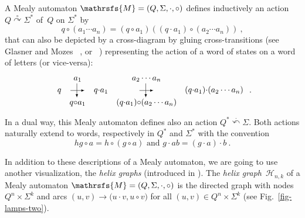 \documentclass{amsart}
\begin{document}
A Mealy automaton ${{{\mathrsfs{{M}}}}}=({{{Q}}},{{{\Sigma}}},{{{\cdot}}},{{{\circ}}})$ defines inductively an action ${{{Q}}}\overset{{{\circ}}}{\curvearrowright} {{{\Sigma}}}^{*}$ of~${{{Q}}}$ on ${{{\Sigma}}}^{*}$ by
$$
q{{{\circ}}} (a_{1}\cdots a_{n})=(q{{{\circ}}} a_{1})\left((q{{{\cdot}}} a_{1}){{{\circ}}} (a_{2}\cdots a_{n})\right)\:,
$$
that can also be depicted by a cross-diagram  by gluing cross-transitions  (see Glasner and Mozes ~\cite{GlaMoz05}, or ~\cite{aklmp12}) representing the action of a word of states on a word of letters (or vice-versa): 
\[\begin{array}{ccccc}
		& a_1            	&            		& a_2 \cdots a_n       			& \\
q		& {\tikz[baseline=-.5ex]{\draw[->,>=latex] (0,0) -- (4ex,0); \draw[->,>=latex] (1.8ex,2ex) -- (1.8ex,-2ex);}}    	& q {{{\cdot}}} a_1 	& {\tikz[baseline=-.5ex]{\draw[->,>=latex] (0,0) -- (4ex,0); \draw[->,>=latex] (1.8ex,2ex) -- (1.8ex,-2ex);}}				&(q {{{\cdot}}} a_1) {{{\cdot}}} (a_2 \cdots a_n)  \\
		& q {{{\circ}}} a_1 	&            		&(q {{{\cdot}}} a_1) {{{\circ}}} (a_2 \cdots a_n)  
\end{array} \: .\]

In a dual way, this Mealy automaton defines also an action  ${{{Q}}}^{*}\overset{{{\cdot}}}{\curvearrowleft} {{{\Sigma}}}$. Both actions naturally extend to words, respectively in ${{{Q}}}^{*}$ and ${{{\Sigma}}}^{*}$ with the convention 
\[hg {{{\circ}}} a  = h{{{\circ}}} (g {{{\circ}}} a) \text{ and } g{{{\cdot}}} ab = (g{{{\cdot}}} a ) {{{\cdot}}} b \:.\]

\bigskip

In addition to these descriptions of a Mealy automaton, we are going to use another visualization,
the \emph{helix graphs} (introduced in \cite{aklmp12}).
The \emph{helix graph}~$\mathcal{H}_{n,k}$ of a Mealy automaton ${{{\mathrsfs{{M}}}}} = ({{{Q}}},{{{\Sigma}}},{{{\cdot}}},{{{\circ}}})$  is the
directed graph with nodes \({{{Q}}}^n\times{{{\Sigma}}}^k\) and arcs \((u,v)
\longrightarrow \bigl(u{{{\cdot}}} v, u{{{\circ}}} v\bigr)\) for all \((u,v) \in {{{Q}}}^n \times {{{\Sigma}}}^k\) (see Fig.~\ref{fig-lamps-two}).
\end{document}
